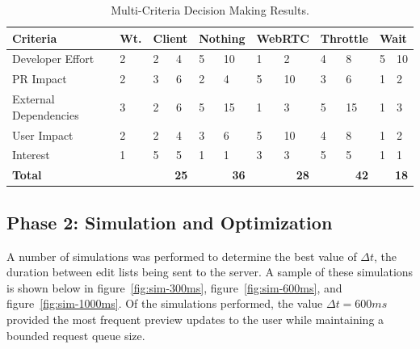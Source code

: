 \documentclass[se,resubmit]{uw-wkrpt}
\begin{document}
\begin{table}
  \caption{Multi-Criteria Decision Making Results.}
  \label{tbl:mcdm}
  \centering
  \begin{tabular}{|p{3.0cm}|p{0.75cm}|
                   p{0.75cm}|p{0.75cm}|p{0.75cm}|p{0.75cm}|p{0.75cm}|
                   p{0.75cm}|p{0.75cm}|p{0.75cm}|p{0.75cm}|p{0.75cm}|}
    \hline
    \textbf{Criteria} &
    \textbf{Wt.} &
    \multicolumn{2}{|p{1.50cm}|}{\textbf{Client}} &
    \multicolumn{2}{|p{1.50cm}|}{\textbf{Nothing}} &
    \multicolumn{2}{|p{1.50cm}|}{\textbf{WebRTC}} &
    \multicolumn{2}{|p{1.50cm}|}{\textbf{Throttle}} &
    \multicolumn{2}{|p{1.50cm}|}{\textbf{Wait}} \\
    \hline
    \hline
    Developer Effort &
       2 &  2 &  4 &  5 & 10 &  1 &  2 &  4 &  8 &  5 & 10 \\
    \hline
    PR Impact &
       2 &  3 &  6 &  2 &  4 &  5 & 10 &  3 &  6 &  1 &  2 \\
    \hline
    External Dependencies &
       3 &  2 &  6 &  5 & 15 &  1 &  3 &  5 & 15 &  1 &  3 \\
    \hline
    User Impact &
       2 &  2 &  4 &  3 &  6 &  5 & 10 &  4 &  8 &  1 &  2 \\
    \hline
    Interest &
       1 &  5 &  5 &  1 &  1 &  3 &  3 &  5 &  5 &  1 &  1 \\
    \hline
    \hline
    \textbf{Total} &
      &
      \multicolumn{2}{|r|}{\textbf{25}} &
      \multicolumn{2}{|r|}{\textbf{36}} &
      \multicolumn{2}{|r|}{\textbf{28}} &
      \multicolumn{2}{|r|}{\textbf{42}} &
      \multicolumn{2}{|r|}{\textbf{18}} \\
    \hline
  \end{tabular}
\end{table}

\subsection{Phase 2: Simulation and Optimization}
A number of simulations was performed to determine the best value of
$\Delta t$, the duration between edit lists being sent to the server. A
sample of these simulations is shown below in figure~\ref{fig:sim-300ms},
figure~\ref{fig:sim-600ms}, and figure~\ref{fig:sim-1000ms}. Of the
simulations performed, the value $\Delta t=600 ms$ provided the most
frequent preview updates to the user while maintaining a bounded request
queue size.
\end{document}
